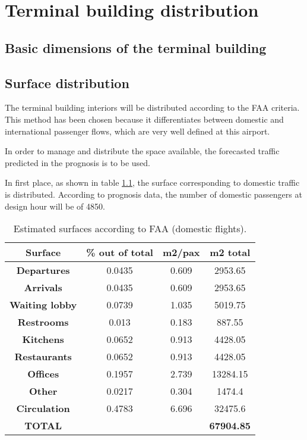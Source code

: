 \chapter{Terminal building distribution}

	\section{Basic dimensions of the terminal building}
	
	
	
	\section{Surface distribution}
	
	The terminal building interiors will be distributed according to the FAA criteria. This method has been chosen because it differentiates between domestic and international passenger flows, which are very well defined at this airport.
	
	\noindent In order to manage and distribute the space available, the forecasted traffic predicted in the prognosis is to be used.
	
	\noindent In first place, as shown in  table  \ref{table:FAAdomestic}, the surface corresponding to domestic traffic is distributed. According to prognosis data, the number of domestic passengers at design hour will be of 4850.
	
	\begin{table}[ht!]
	\label{table:FAAdomestic}
	\centering
	\begin{tabular}{|c|c|c|c|}
	\hline
	\textbf{Surface} & \textbf{\% out of total} & \textbf{m2/pax} & \textbf{m2 total}\\
	\hline
	\textbf{Departures} & 0.0435 & 0.609 & 2953.65 \\
	\hline
	\textbf{Arrivals} & 0.0435 & 0.609 & 2953.65\\
	\hline
	\textbf{Waiting lobby} & 0.0739 & 1.035 & 5019.75\\
	\hline
	\textbf{Restrooms} & 0.013 & 0.183 & 887.55\\
	\hline
	\textbf{Kitchens} & 0.0652 & 0.913 & 4428.05 \\
	\hline
	\textbf{Restaurants} & 0.0652 & 0.913 & 4428.05\\
	\hline
	\textbf{Offices} & 0.1957 & 2.739 & 13284.15\\
	\hline
	\textbf{Other} & 0.0217 & 0.304 & 1474.4\\
	\hline
	\textbf{Circulation} & 0.4783 & 6.696 & 32475.6\\
	\hline
	\textbf{TOTAL} & & & \textbf{67904.85}\\
	\hline
	\end{tabular}
	\caption{Estimated surfaces according to FAA (domestic flights).}
	\end{table}
	
